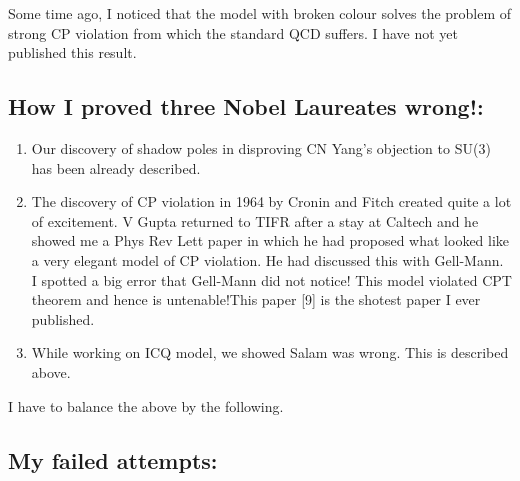Some time ago, I noticed that the model with broken colour solves the 
problem of strong CP violation from which the standard QCD suffers. I 
have not yet published this result.

\subsection*{How I proved three Nobel Laureates wrong!: }

\begin{enumerate}
\item Our discovery of shadow poles in disproving CN Yang's objection to 
SU(3) has been already described.
\item The discovery of CP violation in 1964 by Cronin and Fitch created 
quite a lot of excitement. V Gupta returned to TIFR after a stay at 
Caltech and he showed me a Phys Rev Lett paper in which he had proposed 
what looked like a very elegant model of CP violation. He had discussed 
this with Gell-Mann. I spotted a big error that Gell-Mann did not 
notice! This model violated CPT theorem and hence is untenable!This 
paper [9] is the shotest paper I ever published.
\item While working on ICQ model, we showed Salam was wrong. This is 
described above.
\end{enumerate}

I have to balance the above by the following.

\subsection*{My failed attempts: }

